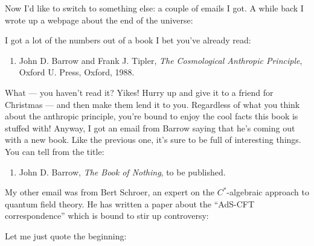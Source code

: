 \documentclass{article}
\def\tightlist{}
\renewcommand{\texttt}[1]{%
  \begingroup
  \ttfamily
  \begingroup\lccode`~=`/\lowercase{\endgroup\def~}{/\discretionary{}{}{}}%
  \begingroup\lccode`~=`[\lowercase{\endgroup\def~}{[\discretionary{}{}{}}%
  \begingroup\lccode`~=`.\lowercase{\endgroup\def~}{.\discretionary{}{}{}}%
  \catcode`/=\active\catcode`[=\active\catcode`.=\active
  \scantokens{#1\noexpand}%
  \endgroup
}
\begin{document}
Now I'd like to switch to something else: a couple of emails I got. A
while back I wrote up a webpage about the end of the universe:


I got a lot of the numbers out of a book I bet you've already read:

\begin{enumerate}
\def\labelenumi{\arabic{enumi})}
\setcounter{enumi}{4}
\tightlist
\item
  John D. Barrow and Frank J. Tipler, \emph{The Cosmological Anthropic
  Principle}, Oxford U. Press, Oxford, 1988.
\end{enumerate}

What --- you haven't read it? Yikes! Hurry up and give it to a friend
for Christmas --- and then make them lend it to you. Regardless of what
you think about the anthropic principle, you're bound to enjoy the cool
facts this book is stuffed with! Anyway, I got an email from Barrow
saying that he's coming out with a new book. Like the previous one, it's
sure to be full of interesting things. You can tell from the title:

\begin{enumerate}
\def\labelenumi{\arabic{enumi})}
\setcounter{enumi}{5}
\tightlist
\item
  John D. Barrow, \emph{The Book of Nothing}, to be published.
\end{enumerate}

My other email was from Bert Schroer, an expert on the \(C^*\)-algebraic
approach to quantum field theory. He has written a paper about the
``AdS-CFT correspondence'' which is bound to stir up controversy:


Let me just quote the beginning:
\end{document}
